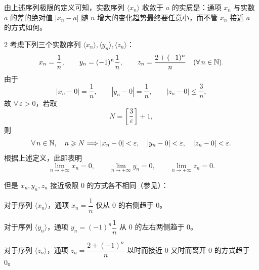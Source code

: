 由上述序列极限的定义可知，实数序列 \(\langle x_n\rangle\) 收敛于 \(a\) 的实质是：通项 \(x_n\) 与实数
\(a\) 的差的绝对值 \(|x_n-a|\) 随 \(n\) 增大的变化趋势最终要任意小，而不管 \(x_n\) 接近 \(a\) 的方式如何。

\begin{sourceexample}{2}
考虑下列三个实数序列 \(\langle x_n\rangle,\langle y_n\rangle,\langle z_n\rangle\)：
\[
x_n=\frac1n,\qquad
y_n=(-1)^n\frac1n,\qquad
z_n=\frac{2+(-1)^n}{n}
\quad(\forall\,n\in\mathbb{N}).
\]
由于
\[
|x_n-0|=\frac1n,\qquad
|y_n-0|=\frac1n,\qquad
|z_n-0|\leqslant\frac3n,
\]
故 \(\forall\,\varepsilon>0\)，若取
\[
N=\left[\frac3\varepsilon\right]+1,
\]
则
\[
\forall\,n\in\mathbb{N},\quad n\geqslant N
\Longrightarrow
|x_n-0|<\varepsilon,\quad
|y_n-0|<\varepsilon,\quad
|z_n-0|<\varepsilon.
\]
根据上述定义，此即表明
\[
\lim_{n\to+\infty}x_n=0,\qquad
\lim_{n\to+\infty}y_n=0,\qquad
\lim_{n\to+\infty}z_n=0.
\]

但是 \(x_n,y_n,z_n\) 接近极限 0 的方式各不相同（参见）：

对于序列 \(\langle x_n\rangle\)，通项 \(x_n=\dfrac1n\) 仅从 0 的右侧趋于 0。

对于序列 \(\langle y_n\rangle\)，通项 \(y_n=(-1)^n\dfrac1n\) 从 0 的左右两侧趋于 0。

对于序列 \(\langle z_n\rangle\)，通项 \(z_n=\dfrac{2+(-1)^n}{n}\) 以时而接近 0 又时而离开 0 的方式趋于 0。
\end{sourceexample}


